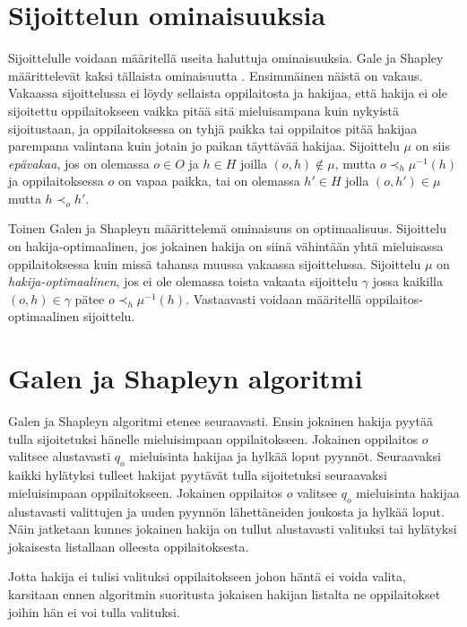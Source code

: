 \documentclass[gradu, twoside]{tktltiki}
\begin{document}
\section{Sijoittelun ominaisuuksia}

Sijoittelulle voidaan määritellä useita haluttuja ominaisuuksia. Gale
ja Shapley määrittelevät kaksi tällaista ominaisuutta
\cite{galeshapley62}. Ensimmäinen näistä on vakaus. Vakaassa
sijoittelussa ei löydy sellaista oppilaitosta ja hakijaa, että hakija
ei ole sijoitettu oppilaitokseen vaikka pitää sitä mieluisampana kuin
nykyistä sijoitustaan, ja oppilaitoksessa on tyhjä paikka tai
oppilaitos pitää hakijaa parempana valintana kuin jotain jo paikan
täyttävää hakijaa. Sijoittelu $\mu$ on siis \emph{epävakaa}, jos on
olemassa $o \in O$ ja $h \in H$ joilla $(o, h) \notin \mu$, mutta $o
\prec_h \mu^{-1}(h)$ ja oppilaitoksessa $o$ on vapaa paikka, tai on
olemassa $h' \in H$ jolla $(o, h') \in \mu$ mutta $h \prec_o h'$.

Toinen Galen ja Shapleyn määrittelemä ominaisuus on optimaalisuus.
Sijoittelu on hakija-optimaalinen, jos jokainen hakija on siinä
vähintään yhtä mieluisassa oppilaitoksessa kuin missä tahansa muussa
vakaassa sijoittelussa. Sijoittelu $\mu$ on
\emph{hakija-optimaalinen}, jos ei ole olemassa toista vakaata
sijoittelu $\gamma$ jossa kaikilla $(o, h) \in \gamma$ pätee $o
\prec_h \mu^{-1}(h)$. Vastaavasti voidaan määritellä
oppilaitos-optimaalinen sijoittelu.

\section{Galen ja Shapleyn algoritmi}

Galen ja Shapleyn algoritmi etenee seuraavasti. Ensin jokainen hakija
pyytää tulla sijoitetuksi hänelle mieluisimpaan oppilaitokseen.
Jokainen oppilaitos $o$ valitsee alustavasti $q_o$ mieluisinta hakijaa
ja hylkää loput pyynnöt. Seuraavaksi kaikki hylätyksi tulleet hakijat
pyytävät tulla sijoitetuksi seuraavaksi mieluisimpaan oppilaitokseen.
Jokainen oppilaitos $o$ valitsee $q_o$ mieluisinta hakijaa alustavasti
valittujen ja uuden pyynnön lähettäneiden joukosta ja hylkää loput.
Näin jatketaan kunnes jokainen hakija on tullut alustavasti valituksi
tai hylätyksi jokaisesta listallaan olleesta oppilaitoksesta.

Jotta hakija ei tulisi valituksi oppilaitokseen johon häntä ei voida
valita, karsitaan ennen algoritmin suoritusta jokaisen hakijan
listalta ne oppilaitokset joihin hän ei voi tulla valituksi.
\end{document}
